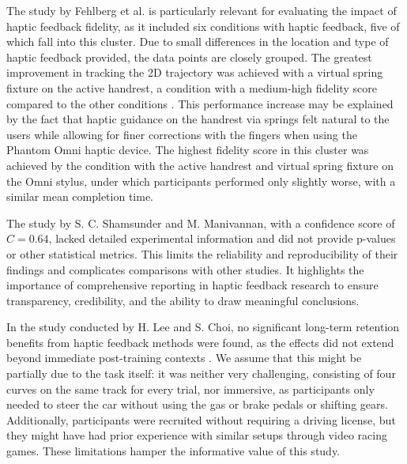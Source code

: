 The study by Fehlberg et al. is particularly relevant for evaluating the impact of haptic feedback fidelity, as it included six conditions with haptic feedback, five of which fall into this cluster. Due to small differences in the location and type of haptic feedback provided, the data points are closely grouped. The greatest improvement in tracking the 2D trajectory was achieved with a virtual spring fixture on the active handrest, a condition with a medium-high fidelity score compared to the other conditions \cite{Fehlberg2012}. This performance increase may be explained by the fact that haptic guidance on the handrest via springs felt natural to the users while allowing for finer corrections with the fingers when using the Phantom Omni haptic device. The highest fidelity score in this cluster was achieved by the condition with the active handrest and virtual spring fixture on the Omni stylus, under which participants performed only slightly worse, with a similar mean completion time.

The study by S. C. Shamsunder and M. Manivannan, with a confidence score of $C=0.64$, lacked detailed experimental information and did not provide p-values or other statistical metrics. This limits the reliability and reproducibility of their findings and complicates comparisons with other studies. It highlights the importance of comprehensive reporting in haptic feedback research to ensure transparency, credibility, and the ability to draw meaningful conclusions.

In the study conducted by H. Lee and S. Choi, no significant long-term retention benefits from haptic feedback methods were found, as the effects did not extend beyond immediate post-training contexts \cite{LeeH2014}. We assume that this might be partially due to the task itself: it was neither very challenging, consisting of four curves on the same track for every trial, nor immersive, as participants only needed to steer the car without using the gas or brake pedals or shifting gears. Additionally, participants were recruited without requiring a driving license, but they might have had prior experience with similar setups through video racing games. These limitations hamper the informative value of this study.

